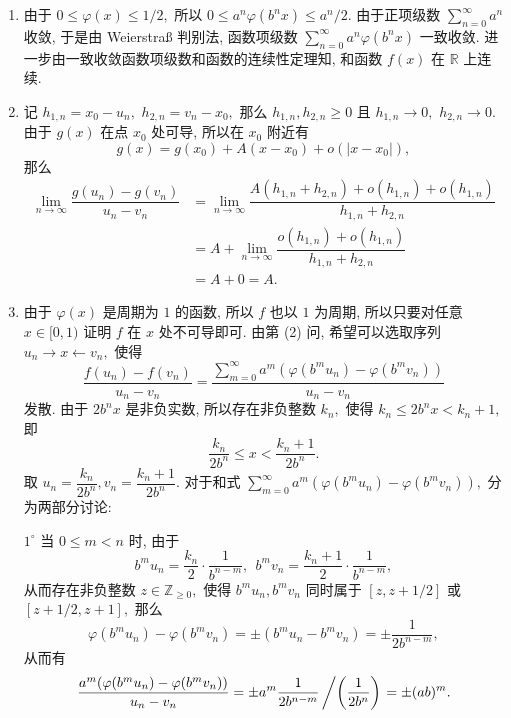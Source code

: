 \begin{solution}
\begin{enumerate}
\item 由于 $0 \leqslant \varphi(x) \leqslant 1/2,$
所以 $0 \leqslant a^n \varphi(b^n x) \leqslant a^n/2.$ 由于正项级数 $\displaystyle \sum_{n=0}^{\infty} a^n$ 收敛,
于是由 Weierstraß 判别法, 函数项级数 $\displaystyle \sum_{n=0}^{\infty} a^n \varphi(b^n x)$ 一致收敛.
进一步由一致收敛函数项级数和函数的连续性定理知, 和函数 $f(x)$ 在 $\mathbb{R}$ 上连续.
\item 记 $h_{1,n} = x_0 - u_n,$ $h_{2,n} = v_n - x_0,$ 那么 $h_{1,n}, h_{2,n} \geqslant 0$ 且 $h_{1,n} \to 0,$ $h_{2,n} \to 0.$ 由于 $g(x)$ 在点 $x_0$ 处可导, 所以在 $x_0$ 附近有
\begin{equation*}
g(x) = g(x_0) + A (x - x_0) + o(|x - x_0|),
\end{equation*}
那么
\begin{align*}
\lim_{n\to\infty} \dfrac{g(u_n) - g(v_n)}{u_n - v_n} & = \lim_{n\to\infty} \dfrac{A (h_{1,n} + h_{2,n}) + o(h_{1,n}) + o(h_{1,n})}{h_{1,n} + h_{2,n}} \\
& = A + \lim_{n\to\infty} \dfrac{o(h_{1,n}) + o(h_{1,n})}{h_{1,n} + h_{2,n}} \\
& = A + 0 = A.
\end{align*}
\item 由于 $\varphi(x)$ 是周期为 $1$ 的函数, 所以 $f$ 也以 $1$ 为周期, 所以只要对任意 $x \in [0, 1)$ 证明 $f$ 在 $x$ 处不可导即可. 由第 (2) 问, 希望可以选取序列 $u_n \rightarrow x \leftarrow v_n,$ 使得
\begin{equation*}
\dfrac{f(u_n) - f(v_n)}{u_n - v_n}
= \dfrac{\sum\limits_{m=0}^{\infty} a^m (\varphi(b^m u_n) - \varphi(b^m v_n))}{u_n - v_n}
\end{equation*} 
发散. 由于 $2 b^n x$ 是非负实数, 所以存在非负整数 $k_n,$ 使得 $k_n \leqslant 2 b^n x < k_n + 1,$ 即
\begin{equation*}
\dfrac{k_n}{2 b^n} \leqslant x < \dfrac{k_n + 1}{2 b^n}.
\end{equation*}
取 $u_n = \dfrac{k_n}{2 b^n}, v_n = \dfrac{k_n + 1}{2 b^n}.$ 对于和式 $\displaystyle \sum\limits_{m=0}^{\infty} a^m (\varphi(b^m u_n) - \varphi(b^m v_n)),$ 分为两部分讨论:

$1^{\circ}$ 当 $0 \leqslant m < n$ 时, 由于
\begin{equation*}
b^m u_n = \dfrac{k_n}{2} \cdot \dfrac{1}{b^{n-m}}, ~~ b^m v_n = \dfrac{k_n + 1}{2} \cdot \dfrac{1}{b^{n-m}},
\end{equation*}
从而存在非负整数 $z \in \mathbb{Z}_{\geqslant 0},$ 使得 $b^m u_n, b^m v_n$ 同时属于 $[z, z+1/2]$ 或 $[z+1/2, z+1],$ 那么
\begin{equation*}
\varphi(b^m u_n) - \varphi(b^m v_n) = \pm (b^m u_n - b^m v_n) = \pm \dfrac{1}{2 b^{n-m}},
\end{equation*}
从而有
\begin{equation*}
\dfrac{a^m (\varphi(b^m u_n) - \varphi(b^m v_n))}{u_n - v_n}
= \pm a^m \dfrac{1}{2 b^{n-m}} \left/ \left( \dfrac{1}{2 b^n}\right) \right.
= \pm (ab)^m.
\end{equation*}


\end{enumerate}
\end{solution}
